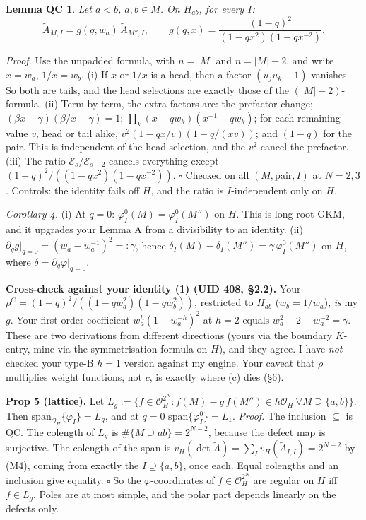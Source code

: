 \documentclass[10pt]{article}
\newcommand{\Atil}{\tilde A}
\theoremstyle{plain}
\newtheorem*{lemQC}{Lemma QC}
\begin{document}
\begin{lemQC}
Let $a<b$, $a,b\in M$. On $H_{ab}$, for \emph{every} $I$:
\[\Atil_{M,I}=g(q,w_a)\,\Atil_{M'',I},\qquad g(q,x)=\frac{(1-q)^2}{(1-qx^2)(1-qx^{-2})}.\]
\end{lemQC}
\emph{Proof.} Use the unpadded formula, with $n=|M|$ and $n=|M|-2$, and write $x=w_a$, $1/x=w_b$.
(i) If $x$ or $1/x$ is a head, then a factor $(u_ju_k-1)$ vanishes. So both are tails, and the head selections are exactly those of the
$(|M|-2)$-formula.
(ii) Term by term, the extra factors are: the prefactor change; $(\beta x-\gamma)(\beta/x-\gamma)=1$; $\prod_k(x-qw_k)(x^{-1}-qw_k)$; for each
remaining value $v$, head or tail alike, $v^2(1-qx/v)(1-q/(xv))$; and $(1-q)$ for the pair. This is independent of the head selection, and the $v^2$ cancel
the prefactor.
(iii) The ratio $\mathcal E_s/\mathcal E_{s-2}$ cancels everything except $(1-q)^2/((1-qx^2)(1-qx^{-2}))$. $\square$
Checked on all $(M,\text{pair},I)$ at $N=2,3$. Controls: the identity fails off $H$, and the ratio is $I$-independent only on $H$.

\emph{Corollary 4.} (i) At $q=0$: $\varphi^0_I(M)=\varphi^0_I(M'')$ on $H$. This is long-root GKM, and it upgrades your Lemma A from a divisibility to an identity.
(ii) $\partial_qg|_{q=0}=(w_a-w_a^{-1})^2=:\gamma$, hence $\delta_I(M)-\delta_I(M'')=\gamma\,\varphi^0_I(M'')$ on $H$, where $\delta=\partial_q\varphi|_{q=0}$.

\textbf{Cross-check against your identity (1) (UID 408, \S2.2).} Your $\rho^C=(1-q)^2/((1-qw_a^2)(1-qw_b^2))$, restricted to $H_{ab}$
($w_b=1/w_a$), \emph{is} my $g$. Your first-order coefficient $w_a^h(1-w_a^{-h})^2$ at $h=2$ equals $w_a^2-2+w_a^{-2}=\gamma$. These are two derivations
from different directions (yours via the boundary $K$-entry, mine via the symmetrisation formula on $H$), and they agree. I have \emph{not} checked your
type-B $h=1$ version against my engine. Your caveat that $\rho$ multiplies weight functions, not $c$, is exactly where (c) dies (\S6).

\textbf{Prop 5 (lattice).} Let $L_g:=\{f\in\mathcal O_H^{2^N}: f(M)-g\,f(M'')\in h\mathcal O_H\ \forall M\supseteq\{a,b\}\}$. Then
$\mathrm{span}_{\mathcal O_H}\{\varphi_I\}=L_g$, and at $q=0$ $\mathrm{span}\{\varphi^0_I\}=L_1$.
\emph{Proof.} The inclusion $\subseteq$ is QC. The colength of $L_g$ is $\#\{M\supseteq ab\}=2^{N-2}$, because the defect map is surjective. The colength of the span
is $v_H(\det\Atil)=\sum_Iv_H(\Atil_{I,I})=2^{N-2}$ by (M4), coming from exactly the $I\supseteq\{a,b\}$, once each. Equal colengths and an inclusion give equality. $\square$
So the $\varphi$-coordinates of $f\in\mathcal O_H^{2^N}$ are regular on $H$ iff $f\in L_g$. Poles are at most simple, and the polar part depends linearly on
the defects only.
\end{document}
